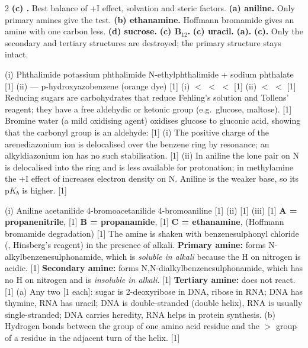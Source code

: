 \documentclass[10pt,a4paper]{extarticle}
\newcommand{\mk}[1]{{\scriptsize\color{black!55}[#1]}}
\begin{document}
\answerstart
\begin{multicols}{2}\raggedcolumns
{}
\An \textbf{(c) .} Best balance of +I effect, solvation and steric factors.
\An \textbf{(a) aniline.} Only primary amines give the test.
\An \textbf{(b) ethanamine.} Hoffmann bromamide gives an amine with one carbon less.
\An \textbf{(d) sucrose.}
\An \textbf{(c) B$_{12}$.}
\An \textbf{(c) uracil.}
\An \textbf{(a).}
\An \textbf{(c).} Only the secondary and tertiary structures are destroyed; the primary structure stays intact.

\An (i) Phthalimide  potassium phthalimide \ce{->[C2H5Br]} N-ethylphthalimide \ce{->[NaOH(aq)]}  + sodium phthalate \mk{1}\nl
(ii) \nl {} — p-hydroxyazobenzene (orange dye) \mk{1}
\An (i)  $<$  $<$  $<$  \mk{1}\nl
(ii)  $<$  $<$  \mk{1}
\An Reducing sugars are carbohydrates that reduce Fehling's solution and Tollens' reagent; they have a free aldehydic or ketonic group (e.g.\ glucose, maltose). \mk{1}\nl
Bromine water (a mild oxidising agent) oxidises glucose to gluconic acid, showing that the carbonyl group is an aldehyde:\nl {} \mk{1}
\An (i) The positive charge of the arenediazonium ion is delocalised over the benzene ring by resonance; an alkyldiazonium ion has no such stabilisation. \mk{1}\nl
(ii) In aniline the lone pair on N is delocalised into the ring and is less available for protonation; in methylamine the +I effect of  increases electron density on N. Aniline is the weaker base, so its p$K_b$ is higher. \mk{1}

\An (i) Aniline \ce{->[(CH3CO)2O][pyridine]} acetanilide \ce{->[Br2][CH3COOH]} 4-bromoacetanilide \ce{->[H+ or OH-][H2O]} 4-bromoaniline \mk{1}\nl
(ii)  \mk{1}\nl
(iii)  \mk{1}
\An \textbf{A = propanenitrile},  \mk{1}\nl
\textbf{B = propanamide},  \mk{1}\nl
\textbf{C = ethanamine},  (Hoffmann bromamide degradation) \mk{1}
\An The amine is shaken with benzenesulphonyl chloride (, Hinsberg's reagent) in the presence of alkali.\nl
\textbf{Primary amine:} forms N-alkylbenzenesulphonamide, which is \emph{soluble in alkali} because the H on nitrogen is acidic. \mk{1}\nl
\textbf{Secondary amine:} forms N,N-dialkylbenzenesulphonamide, which has no H on nitrogen and is \emph{insoluble in alkali}. \mk{1}\nl
\textbf{Tertiary amine:} does not react. \mk{1}
\An (a) Any two \mk{1 each}: sugar is 2-deoxyribose in DNA, ribose in RNA; DNA has thymine, RNA has uracil; DNA is double-stranded (double helix), RNA is usually single-stranded; DNA carries heredity, RNA helps in protein synthesis.\nl
(b) Hydrogen bonds between the  group of one amino acid residue and the $>$ group of a residue in the adjacent turn of the helix. \mk{1}


\end{multicols}
\end{document}
